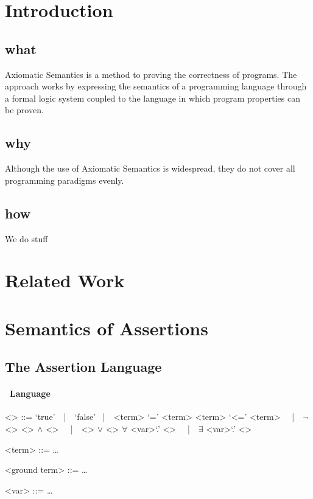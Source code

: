 



\section{Introduction}
\label{sec:intro}

\subsection{what}

Axiomatic Semantics is a method to proving the correctness of
programs.
%
The approach works by expressing the semantics of a programming language
through a formal logic system coupled to the language in which program
properties can be proven.


\subsection{why}

Although the use of Axiomatic Semantics is widespread, they do not cover
all programming paradigms evenly.




\subsection{how}

We do stuff


\section{Related Work}
\label{sec:rel-work}

\section{Semantics of Assertions}
\label{sec:sem-ass}

\subsection{The Assertion Language}

\paragraph{\Cond\ Language}
\setlength{\grammarparsep}{20pt plus 1pt minus 1pt} %
\setlength{\grammarindent}{5em} %
\begin{grammar}
<\Cond> ::= `true'\ \ |\ \ `false'
\ |\ \  <term> `=' <term> 
\alt  <term> `<=' <term>
\ \ |\ \  $\neg$ <\Cond>
\alt <\Cond> $\wedge$ <\Cond>
\ \ |\ \  <\Cond> $\vee$ <\Cond>
\alt  $\forall$ <var>`.' <\Cond>
\ \ |\ \  $\exists$ <var>`.' <\Cond>

<term> ::= \dots

<ground term> ::= \dots

<var> ::= \dots
\end{grammar}

